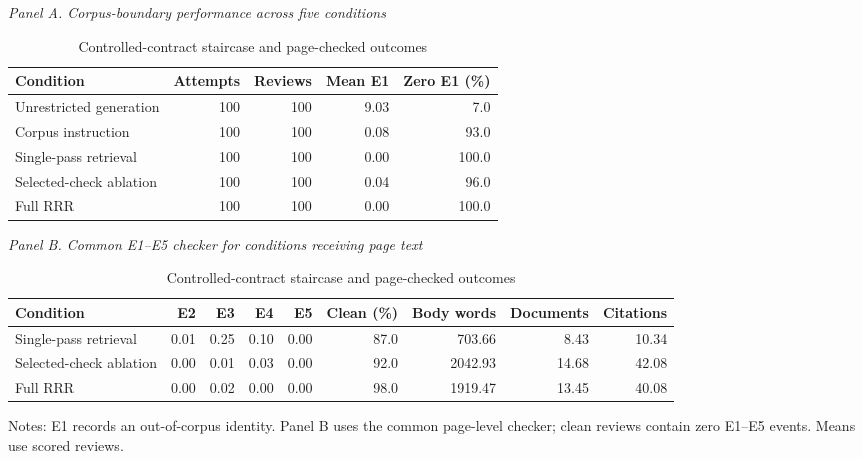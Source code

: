 \begin{table}[ht]
\centering
\caption{Controlled-contract staircase and page-checked outcomes}
\begin{threeparttable}
\small
\textit{Panel A. Corpus-boundary performance across five conditions}\\[0.35em]
\begin{tabular}{lrrrr}
\toprule
Condition & Attempts & Reviews & Mean E1 & Zero E1 (\%) \\
\midrule
Unrestricted generation & 100 & 100 & 9.03 & 7.0 \\
Corpus instruction & 100 & 100 & 0.08 & 93.0 \\
Single-pass retrieval & 100 & 100 & 0.00 & 100.0 \\
Selected-check ablation & 100 & 100 & 0.04 & 96.0 \\
Full RRR & 100 & 100 & 0.00 & 100.0 \\
\bottomrule
\end{tabular}
\par\vspace{0.8em}
\textit{Panel B. Common E1--E5 checker for conditions receiving page text}\\[0.35em]
\begin{tabular}{lrrrrrrrr}
\toprule
Condition & E2 & E3 & E4 & E5 & Clean (\%) & Body words & Documents & Citations \\
\midrule
Single-pass retrieval & 0.01 & 0.25 & 0.10 & 0.00 & 87.0 & 703.66 & 8.43 & 10.34 \\
Selected-check ablation & 0.00 & 0.01 & 0.03 & 0.00 & 92.0 & 2042.93 & 14.68 & 42.08 \\
Full RRR & 0.00 & 0.02 & 0.00 & 0.00 & 98.0 & 1919.47 & 13.45 & 40.08 \\
\bottomrule
\end{tabular}
\begin{tablenotes}[flushleft]\scriptsize
\item Notes: E1 records an out-of-corpus identity. Panel B uses the common page-level checker; clean reviews contain zero E1--E5 events. Means use scored reviews.
\end{tablenotes}
\end{threeparttable}
\end{table}
